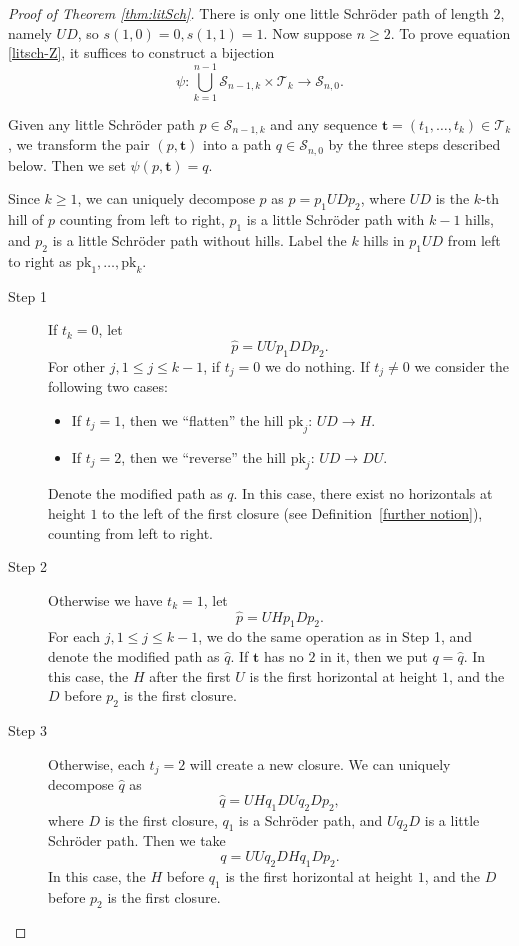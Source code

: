 \documentclass[11pt,reqno]{amsart}
\numberwithin{equation}{section}
\theoremstyle{plain}
\theoremstyle{definition}
\newcommand{\s}{\mathcal{S}}
\newcommand{\T}{\mathcal{T}}
\begin{document}
\begin{proof}[Proof of Theorem \ref{thm:litSch}] There is only one little Schr\"oder path of length $2$, namely $UD$, so $s(1,0)=0,s(1,1)=1$. Now suppose $n\ge 2$. To prove equation \eqref{litsch-Z}, it suffices to construct a bijection $$\psi:\bigcup_{k=1}^{n-1}\s_{n-1,k}\times\T_k\rightarrow \s_{n,0}.$$

Given any little Schr\"oder path $p\in\s_{n-1,k}$ and any sequence $\mathbf{t}=(t_1,\dots,t_k)\in\T_k$, we transform the pair $(p,\mathbf{t})$ into a path $q\in\s_{n,0}$ by the three steps described below. Then we set $\psi(p,\mathbf{t})=q$.

Since $k\geq 1$, we can uniquely decompose $p$ as $p=p_1UDp_2$, where $UD$ is the $k$-th hill of $p$ counting from left to right, $p_1$ is a little Schr\"oder path with $k-1$ hills, and $p_2$ is a little Schr\"oder path without hills. Label the $k$ hills in $p_1UD$ from left to right as $\mathrm{pk}_1,\ldots,\mathrm{pk}_k$.
\begin{description}
\item[Step 1] If $t_k=0$, let $$\hat{p}=UUp_1DDp_2.$$ For other $j,1\le j\le k-1$, if $t_j=0$ we do nothing. If $t_j\neq0$ we consider the following two cases:
\begin{itemize}
\item If $t_j=1$, then we ``flatten'' the hill $\mathrm{pk}_j$: $UD\rightarrow H$.
\item If $t_j=2$, then we ``reverse'' the hill $\mathrm{pk}_j$: $UD\rightarrow DU$.
\end{itemize}
Denote the modified path as $q$. In this case, there exist no horizontals at height $1$ to the left of the first closure (see Definition~\ref{further notion}), counting from left to right.
\item[Step 2] Otherwise we have $t_k=1$, let $$\hat{p}=UHp_1Dp_2.$$ For each $j,1\le j\le k-1$, we do the same operation as in Step 1, and denote the modified path as $\hat{q}$. If $\mathbf{t}$ has no $2$ in it, then we put $q=\hat{q}$. In this case, the $H$ after the first $U$ is the first horizontal at height $1$, and the $D$ before $p_2$ is the first closure.
\item[Step 3] Otherwise, each $t_j=2$ will create a new closure. We can uniquely decompose $\hat{q}$ as
$$\hat{q}=UHq_1DUq_2Dp_2,$$
where $D$ is the first closure, $q_{1}$ is a Schr\"oder path, and $Uq_2D$ is a little Schr\"oder path. Then we take $$q=UUq_2DHq_1Dp_2.$$
In this case, the $H$ before $q_1$ is the first horizontal at height $1$, and the $D$ before $p_2$ is the first closure.
\end{description}


\end{proof}
\end{document}
